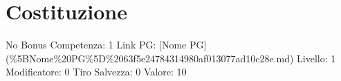 \section{Costituzione}\label{costituzione}

\begin{description}
\tightlist
\item[Tags: STAT]
No Bonus Competenza: 1 Link PG: {[}Nome PG{]}
(\%5BNome\%20PG\%5D\%2063f5e24784314980af013077ad10c28e.md) Livello: 1
Modificatore: 0 Tiro Salvezza: 0 Valore: 10
\end{description}
